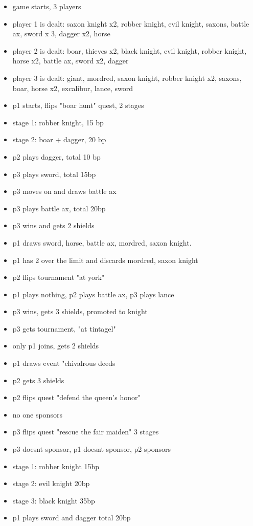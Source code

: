 \documentclass[11pt]{article}
\begin{document}
\begin{enumerate}
	\begin{itemize}
	\item game starts, 3 players
	\item player 1 is dealt: saxon knight x2, robber knight, evil knight, saxons, battle ax, sword x 3, dagger x2, horse 
	\item player 2 is dealt: boar, thieves x2, black knight, evil knight, robber knight, horse x2, battle ax, sword x2, dagger
	\item player 3 is dealt: giant, mordred, saxon knight, robber knight x2, saxons, boar, horse x2, excalibur, lance, sword
	\item p1 starts, flips "boar hunt" quest, 2 stages
	\item stage 1: robber knight, 15 bp
	\item stage 2: boar + dagger, 20 bp
	\item p2 plays dagger, total 10 bp
	\item p3 plays sword, total 15bp
	\item p3 moves on and draws battle ax
	\item p3 plays battle ax, total 20bp
	\item p3 wins and gets 2 shields
	\item p1 draws sword, horse, battle ax, mordred, saxon knight.
	\item p1 has 2 over the limit and discards mordred, saxon knight
	\item p2 flips tournament "at york"
	\item p1 plays nothing, p2 plays battle ax, p3 plays lance
	\item p3 wins, gets 3 shields, promoted to knight
	\item p3 gets tournament, "at tintagel"
	\item only p1 joins, gets 2 shields
	\item p1 draws event "chivalrous deeds
	\item p2 gets 3 shields
	\item p2 flips quest "defend the queen's honor"
	\item no one sponsors
	\item p3 flips quest "rescue the fair maiden" 3 stages
	\item p3 doesnt sponsor, p1 doesnt sponsor, p2 sponsors
	\item stage 1: robber knight 15bp
	\item stage 2: evil knight 20bp
	\item stage 3: black knight 35bp
	\item p1 plays sword and dagger total 20bp

\end{itemize}
\end{enumerate}
\end{document}
